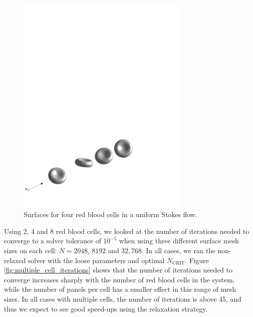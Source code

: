 \documentclass[final,3p,times]{elsarticle}
\newcommand{\ncrit}{N_{\text{CRIT}}}
\begin{document}
\begin{figure}[ht]
\begin{center}
\includegraphics[natwidth=6in,natheight=2.88in,width=0.75\textwidth]{4Cells_arrow.pdf}
	\caption{Surfaces for four red blood cells in a uniform Stokes flow.}
	\label{fig:multiple_cells}
\end{center}
\end{figure}

Using 2, 4 and 8 red blood cells, we looked at the number of iterations needed to converge to a solver tolerance of $10^{-5}$ when using three different surface mesh sizes on each cell: $N=2048$, $8192$ and $32,768$. In all cases, we ran the non-relaxed solver with the loose parameters and optimal $\ncrit$. Figure \ref{fig:multiple_cell_iterations} shows that the number of iterations needed to converge increases sharply with the number of red blood cells in the system, while the number of panels per cell has a smaller effect in this range of mesh sizes. In all cases with multiple cells, the number of iterations is above 45, and thus we expect to see good speed-ups using the relaxation strategy.
\end{document}

